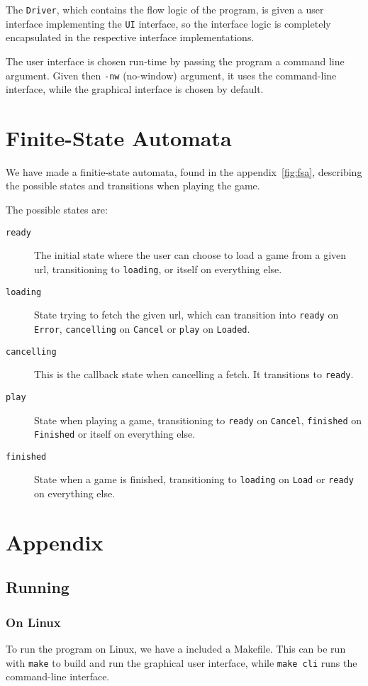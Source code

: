 \documentclass{article}
\begin{document}
The {\tt Driver}, which contains the flow logic of the program, is given a user interface implementing the {\tt UI} interface, so the interface logic is completely encapsulated in the respective interface implementations.

The user interface is chosen run-time by passing the program a command line argument. Given then {\tt -nw} (no-window) argument, it uses the command-line interface, while the graphical interface is chosen by default.

\section{Finite-State Automata}
\label{sec:fsa}
We have made a finitie-state automata, found in the appendix~\ref{fig:fsa}, describing the possible states and transitions when playing the game.

The possible states are:
\begin{description}
\item[{\tt ready}] The initial state where the user can choose to load a game from a given url, transitioning to {\tt loading}, or itself on everything else.
\item[{\tt loading}] State trying to fetch the given url, which can transition into {\tt ready} on {\tt Error}, {\tt cancelling} on {\tt Cancel} or {\tt play} on {\tt Loaded}.
\item[{\tt cancelling}] This is the callback state when cancelling a fetch. It transitions to {\tt ready}.
\item[{\tt play}] State when playing a game, transitioning to {\tt ready} on {\tt Cancel}, {\tt finished} on {\tt Finished} or itself on everything else.
\item[{\tt finished}] State when a game is finished, transitioning to {\tt loading} on {\tt Load} or {\tt ready} on everything else.
\end{description}
\clearpage
\section{Appendix}

\subsection{Running}
\subsubsection{On Linux}
To run the program on Linux, we have a included a Makefile. This can be run with {\tt make} to build and run the graphical user interface, while {\tt make cli} runs the command-line interface.
\end{document}
